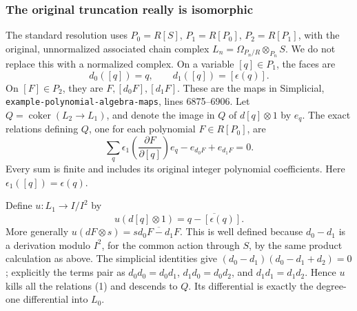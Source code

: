 \subsubsection{The original truncation really is isomorphic}\label{the-original-truncation-really-is-isomorphic}

The standard resolution uses \(P_0=R[S]\), \(P_1=R[P_0]\), \(P_2=R[P_1]\), with the original, unnormalized associated chain complex \(L_n=\Omega_{P_n/R}\otimes_{P_n}S\). We do not replace this with a normalized complex. On a variable \([q]\in P_1\), the faces are \[
d_0([q])=q,\qquad d_1([q])=[\epsilon(q)].
\] On \([F]\in P_2\), they are \(F,[d_0F],[d_1F]\). These are the maps in Simplicial, \texttt{example-polynomial-algebra-maps}, lines 6875--6906. Let \(Q=\operatorname{coker}(L_2\to L_1)\), and denote the image in \(Q\) of \(d[q]\otimes1\) by \(e_q\). The exact relations defining \(Q\), one for each polynomial \(F\in R[P_0]\), are \[
\sum_q \epsilon_1\!\left(\frac{\partial F}{\partial[q]}\right)e_q
-e_{d_0F}+e_{d_1F}=0.\tag{1}
\] Every sum is finite and includes its original integer polynomial coefficients. Here \(\epsilon_1([q])=\epsilon(q)\).

Define \(u:L_1\to I/I^2\) by \[
u(d[q]\otimes1)=\overline{q-[\epsilon(q)]}.
\] More generally \(u(dF\otimes s)=s\overline{d_0F-d_1F}\). This is well defined because \(d_0-d_1\) is a derivation modulo \(I^2\), for the common action through \(S\), by the same product calculation as above. The simplicial identities give \((d_0-d_1)(d_0-d_1+d_2)=0\); explicitly the terms pair as \(d_0d_0=d_0d_1\), \(d_1d_0=d_0d_2\), and \(d_1d_1=d_1d_2\). Hence \(u\) kills all the relations (1) and descends to \(Q\). Its differential is exactly the degree-one differential into \(L_0\).

